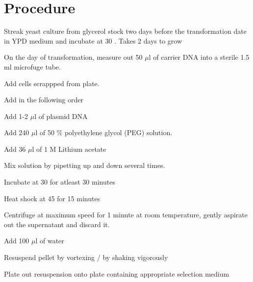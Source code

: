 	\section{Procedure}
		\begin{packed_enum}
			\item Streak yeast culture from glycerol stock two days before the transformation date in YPD medium and incubate at {30 \textcelsius}. Takes 2 days to grow
			\item On the day of transformation, measure out 50 $\mu$l of carrier DNA into a sterile 1.5 ml microfuge tube.
			\item Add cells scrappped from plate.
			\item Add in the following order
			\begin{packed_enum}
			\item Add 1-2 $\mu$l of plasmid DNA
			\item Add 240 $\mu$l of 50 \% polyethylene glycol (PEG) solution.
			\item Add 36 $\mu$l of 1 M Lithium acetate 
			\end{packed_enum}
			\item Mix solution by  pipetting up and down several times.
			\item Incubate at 30 {\textcelsius} for atleast 30 minutes
			\item Heat shock at 45 {\textcelsius} for 15 minutes
			\item Centrifuge at maximum speed for 1 minute at room temperature, gently aspirate out the supernatant and discard it.
			\item Add 100 $\mu$l of water
			\begin{packed_enum}
			\item Resuspend pellet by vortexing / by shaking vigorously
			\item Plate out resuspension onto plate containing appropriate selection medium
			\end{packed_enum}
		\end{packed_enum}
	
